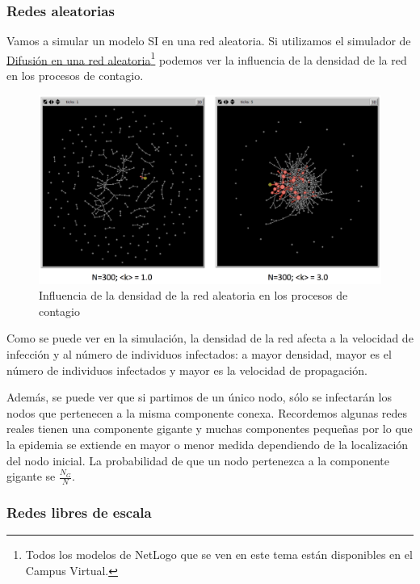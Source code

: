 \documentclass[]{article}
\begin{document}
\subsubsection{Redes aleatorias}\label{redes-aleatorias}

Vamos a simular un modelo SI en una red aleatoria. Si utilizamos el
simulador de
\href{http://www.ladamic.com/netlearn/NetLogo501/ERDiffusion.html}{Difusión
en una red aleatoria}\footnote{Todos los modelos de NetLogo que se ven
  en este tema están disponibles en el Campus Virtual.} podemos ver la
influencia de la densidad de la red en los procesos de contagio.

\begin{figure}[htbp]
\centering
\includegraphics{../images/tema08/contagioER.png}
\caption{Influencia de la densidad de la red aleatoria en los procesos
de contagio}
\end{figure}

Como se puede ver en la simulación, la densidad de la red afecta a la
velocidad de infección y al número de individuos infectados: a mayor
densidad, mayor es el número de individuos infectados y mayor es la
velocidad de propagación.

Además, se puede ver que si partimos de un único nodo, sólo se
infectarán los nodos que pertenecen a la misma componente conexa.
Recordemos algunas redes reales tienen una componente gigante y muchas
componentes pequeñas por lo que la epidemia se extiende en mayor o menor
medida dependiendo de la localización del nodo inicial. La probabilidad
de que un nodo pertenezca a la componente gigante se \(\frac{N_G}{N}\).

\subsubsection{Redes libres de escala}\label{redes-libres-de-escala}
\end{document}
